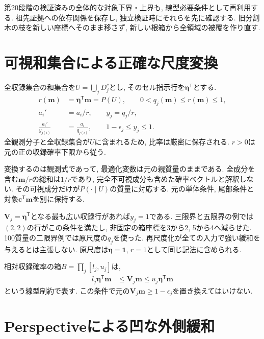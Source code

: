 第20段階の検証済みの全体的な対象下界・上界も,
線型必要条件として再利用する.
祖先証拠への依存関係を保存し, 独立検証時にそれらを先に確認する.
旧分割木の枝を新しい座標へそのまま移さず,
新しい根箱から全領域の被覆を作り直す.

\section{可視和集合による正確な尺度変換}
\label{sec:stage21_relative_scale}

全収録集合の和集合を$U=\bigcup_jD_j^c$とし,
そのセル指示行を$\bm\eta^{\mathsf T}$とする.
\begin{align}
r(\bm m)&=\bm\eta^{\mathsf T}\bm m=P(U),\qquad
0<q_j(\bm m)\le r(\bm m)\le1,
\label{eq:stage21_visibility_scale}\\
a_i'&=a_i/r,\qquad y_j=q_j/r,
\label{eq:stage21_relative_coordinates}\\
\frac{a_i'}{y_{j(i)}}&=\frac{a_i}{q_{j(i)}},\qquad
1-\epsilon_j\le y_j\le1.
\label{eq:stage21_ratio_invariance}
\end{align}
全観測分子と全収録集合が$U$に含まれるため, 比率は厳密に保存される.
$r>0$は元の正の収録確率下限から従う.

変換するのは観測式であって, 最適化変数は元の親質量のままである.
全成分を含む$\bm m/r$の総和は$1/r$であり,
完全不可視成分も含めた確率ベクトルと解釈しない.
その可視成分だけが$P(\cdot\mid U)$の質量に対応する.
元の単体条件, 尾部条件と対象$\bm c^{\mathsf T}\bm m$を別に保持する.

$\bm V_j=\bm\eta^{\mathsf T}$となる最も広い収録行があれば$y_j=1$である.
三限界と五限界の例では$(2,2)$の行がこの条件を満たし,
非固定の箱座標を3から2, 5から4へ減らせた.
100質量の二限界例では原尺度の$q_j$を使った.
再尺度化が全ての入力で強い緩和を与えるとは主張しない.
原尺度は$\bm\eta=\bm1$, $r=1$として同じ記法に含められる.

相対収録確率の箱$B=\prod_j[l_j,u_j]$は,
\begin{align}
l_j\bm\eta^{\mathsf T}\bm m
&\le\bm V_j\bm m\le u_j\bm\eta^{\mathsf T}\bm m
\label{eq:stage21_relative_box}
\end{align}
という線型制約で表す.
この条件で元の$\bm V_j\bm m\ge1-\epsilon_j$を置き換えてはいけない.

\section{Perspectiveによる凹な外側緩和}
\label{sec:stage21_perspective}

